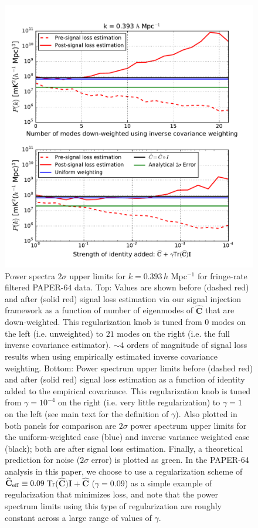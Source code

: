 \documentclass[preprint2,numberedappendix,tighten]{aastex6}  %
\begin{document}
\begin{figure}
	\centering
	\includegraphics[width=1\textwidth]{plots/sigloss_modeloop_2panel.pdf}
	\caption{Power spectra $2\sigma$ upper limits for $k=0.393$\,$h$ Mpc$^{-1}$ for fringe-rate filtered PAPER-64 data. Top: Values 
are shown before (dashed red) and after (solid red) signal loss estimation via our signal injection framework as a function of number of eigenmodes of $\widehat{\textbf{C}}$ that 
are down-weighted. This regularization knob is tuned from $0$ modes on the left (i.e. unweighted) to $21$ modes on the right (i.e. the full inverse 
covariance estimator). $\sim4$ orders of magnitude of signal loss results when using empirically estimated inverse covariance weighting. Bottom: Power spectrum upper limits before (dashed red) and after (solid red) signal loss estimation as a function of identity added to the empirical covariance. This regularization knob is tuned from $\gamma = 10^{-4}$ on the right (i.e. very little regularization) to $\gamma = 1$ on the left (see main text for the definition of $\gamma$). Also 
plotted in both panels for comparison are $2\sigma$ power spectrum upper limits for the uniform-weighted case (blue) and inverse variance 
weighted case (black); both are after signal loss estimation. Finally, a theoretical prediction for noise ($2\sigma$ error) is plotted 
as green. In the PAPER-64 analysis in this paper, we choose to use a regularization scheme of $\widehat{\textbf{C}}_{\rm eff} \equiv 0.09 \, $Tr($\widehat{\textbf{C}})\textbf{I} + \widehat{\textbf{C}}$ ($\gamma = 0.09$) as a simple example of regularization that minimizes loss, and note that the power spectrum limits using this type of regularization are roughly constant across a large range of values of $\gamma$.}
	\label{fig:sigloss_modeloop}
\end{figure}
\end{document}
